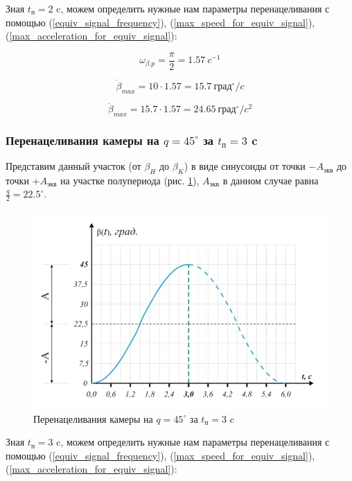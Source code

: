 Зная $t_{\text{п} } = 2$ c, можем определить нужные нам параметры перенацеливания с помощью (\ref{equiv_signal_frequency}), (\ref{max_speed_for_equiv_signal}), (\ref{max_acceleration_for_equiv_signal}):

$$ \omega_{\beta.p} = \frac{\pi}{2} = 1.57 ~c^{-1}                            $$

$$ \dot{\beta}_{max} = 10 \cdot 1.57 = 15.7 ~\text{град}^{\circ} / c           $$

$$ \ddot{\beta}_{max} = 15.7 \cdot 1.57 = 24.65 ~\text{град}^{\circ} / c^{2}   $$


\subsubsection{Перенацеливания камеры на $q = 45^{\circ}$ за $t_\text{п} = 3$ c}

Представим данный участок (от $\beta_{H}$ до $\beta_{K}$) в виде синусоиды от точки $-A_\text{экв}$ до точки $+A_\text{экв}$ на участке полупериода (рис. \ref{retarget_45grad_3sec}), $A_\text{экв}$ в данном случае равна $\frac{q}{2} = 22.5^{\circ}$.

\begin{figure}[h!]
    \centering
    \includegraphics[keepaspectratio]{./src/pictures/retarget_equivalent_input_signals/45grad_3sec}
    \caption{Перенацеливания камеры на $q = 45^{\circ}$ за $t_\text{п} = 3$ c}
    \label{retarget_45grad_3sec}
\end{figure}

Зная $t_{\text{п} } = 3$ c, можем определить нужные нам параметры перенацеливания с помощью (\ref{equiv_signal_frequency}), (\ref{max_speed_for_equiv_signal}), (\ref{max_acceleration_for_equiv_signal}):

